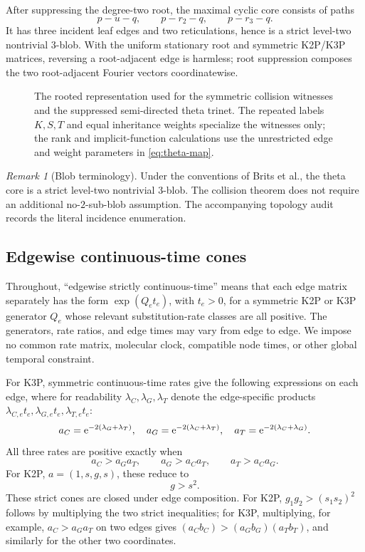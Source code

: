 \documentclass[11pt]{article}
\theoremstyle{remark}\newtheorem{remark}[theorem]{Remark}
\begin{document}
After suppressing the degree-two root, the maximal cyclic core consists of paths
\[
p-u-q,\qquad p-r_2-q,\qquad p-r_3-q.
\]
It has three incident leaf edges and two reticulations, hence is a strict level-two nontrivial $3$-blob. With the uniform stationary root and symmetric K2P/K3P matrices, reversing a root-adjacent edge is harmless; root suppression composes the two root-adjacent Fourier vectors coordinatewise.
\begin{figure}[ht]
\centering\resizebox{\textwidth}{!}{}
\caption{The rooted representation used for the symmetric collision witnesses and the suppressed semi-directed theta trinet. The repeated labels $K,S,T$ and equal inheritance weights specialize the witnesses only; the rank and implicit-function calculations use the unrestricted edge and weight parameters in \eqref{eq:theta-map}.}
\label{fig:theta}
\end{figure}
\begin{remark}[Blob terminology]
Under the conventions of Brits et al., the theta core is a strict level-two nontrivial $3$-blob. The collision theorem does not require an additional no-$2$-sub-blob assumption. The accompanying topology audit records the literal incidence enumeration.
\end{remark}

\subsection{Edgewise continuous-time cones}
Throughout, ``edgewise strictly continuous-time'' means that each edge matrix separately has the form $\exp(Q_e t_e)$, with $t_e>0$, for a symmetric K2P or K3P generator $Q_e$ whose relevant substitution-rate classes are all positive. The generators, rate ratios, and edge times may vary from edge to edge. We impose no common rate matrix, molecular clock, compatible node times, or other global temporal constraint.

For K3P, symmetric continuous-time rates give the following expressions on each edge, where for readability $\lambda_C,\lambda_G,\lambda_T$ denote the edge-specific products $\lambda_{C,e}t_e,\lambda_{G,e}t_e,\lambda_{T,e}t_e$:
\[
a_C=\mathrm e^{-2(\lambda_G+\lambda_T)},\quad a_G=\mathrm e^{-2(\lambda_C+\lambda_T)},\quad a_T=\mathrm e^{-2(\lambda_C+\lambda_G)}.
\]
All three rates are positive exactly when
\begin{equation}\label{eq:k3p-ct}a_C>a_Ga_T,\qquad a_G>a_Ca_T,\qquad a_T>a_Ca_G.\end{equation}
For K2P, $a=(1,s,g,s)$, these reduce to
\begin{equation}\label{eq:k2p-ct}g>s^2.\end{equation}
These strict cones are closed under edge composition. For K2P,
$g_1g_2>(s_1s_2)^2$ follows by multiplying the two strict inequalities; for
K3P, multiplying, for example, $a_C>a_Ga_T$ on two edges gives
$(a_Cb_C)>(a_Gb_G)(a_Tb_T)$, and similarly for the other two coordinates.
\end{document}
